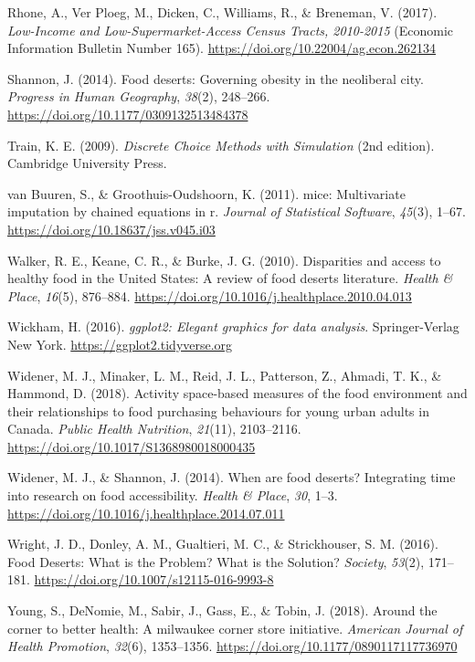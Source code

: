 \documentclass[
  letterpaper,
  number,
  review,
  3p]{elsarticle}
\newlength{\cslhangindent}
\newenvironment{CSLReferences}[2] %
 {\begin{list}{}{%
  \setlength{\itemindent}{0pt}
  \setlength{\leftmargin}{0pt}
  \setlength{\parsep}{0pt}
  \ifodd #1
   \setlength{\leftmargin}{\cslhangindent}
   \setlength{\itemindent}{-1\cslhangindent}
  \fi
  \setlength{\itemsep}{#2\baselineskip}}}
 {\end{list}}
\begin{document}
\begin{CSLReferences}{1}{0}
Rhone, A., Ver Ploeg, M., Dicken, C., Williams, R., \& Breneman, V.
(2017). \emph{Low-{Income} and {Low-Supermarket-Access Census Tracts},
2010-2015} (Economic {Information Bulletin Number} 165).
\url{https://doi.org/10.22004/ag.econ.262134}

Shannon, J. (2014). Food deserts: {Governing} obesity in the neoliberal
city. \emph{Progress in Human Geography}, \emph{38}(2), 248--266.
\url{https://doi.org/10.1177/0309132513484378}

Train, K. E. (2009). \emph{Discrete {Choice Methods} with {Simulation}}
(2nd edition). Cambridge University Press.

van Buuren, S., \& Groothuis-Oudshoorn, K. (2011). {mice}: Multivariate
imputation by chained equations in r. \emph{Journal of Statistical
Software}, \emph{45}(3), 1--67.
\url{https://doi.org/10.18637/jss.v045.i03}

Walker, R. E., Keane, C. R., \& Burke, J. G. (2010). Disparities and
access to healthy food in the {United States}: {A} review of food
deserts literature. \emph{Health \& Place}, \emph{16}(5), 876--884.
\url{https://doi.org/10.1016/j.healthplace.2010.04.013}

Wickham, H. (2016). \emph{ggplot2: Elegant graphics for data analysis}.
Springer-Verlag New York. \url{https://ggplot2.tidyverse.org}

Widener, M. J., Minaker, L. M., Reid, J. L., Patterson, Z., Ahmadi, T.
K., \& Hammond, D. (2018). Activity space-based measures of the food
environment and their relationships to food purchasing behaviours for
young urban adults in {Canada}. \emph{Public Health Nutrition},
\emph{21}(11), 2103--2116.
\url{https://doi.org/10.1017/S1368980018000435}

Widener, M. J., \& Shannon, J. (2014). When are food deserts?
{Integrating} time into research on food accessibility. \emph{Health \&
Place}, \emph{30}, 1--3.
\url{https://doi.org/10.1016/j.healthplace.2014.07.011}

Wright, J. D., Donley, A. M., Gualtieri, M. C., \& Strickhouser, S. M.
(2016). Food {Deserts}: {What} is the {Problem}? {What} is the
{Solution}? \emph{Society}, \emph{53}(2), 171--181.
\url{https://doi.org/10.1007/s12115-016-9993-8}

Young, S., DeNomie, M., Sabir, J., Gass, E., \& Tobin, J. (2018). Around
the corner to better health: A milwaukee corner store initiative.
\emph{American Journal of Health Promotion}, \emph{32}(6), 1353--1356.
\url{https://doi.org/10.1177/0890117117736970}

\end{CSLReferences}
\end{document}
